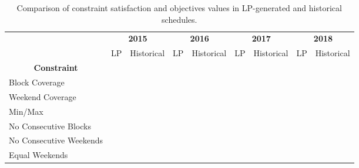 \begin{sidewaystable}[htbp] %
    \centering
    \caption{Comparison of constraint satisfaction and objectives values in LP-generated and historical schedules.}%
    \label{tbl:constraints-comparison}
		\begin{tabular}{l|cc|cc|cc|cc}
      \toprule
			\multirow{2}[1]{*}{}                                & \multicolumn{2}{c|}{\textbf{2015}} & \multicolumn{2}{c|}{\textbf{2016}} & \multicolumn{2}{c|}{\textbf{2017}} & \multicolumn{2}{c}{\textbf{2018}} \\
			                                                    &     LP     &      Historical       &     LP     &      Historical       &     LP     &      Historical       &     LP     &      Historical      \\ \midrule
			\multicolumn{1}{c|}{\textbf{Constraint}}            &            &                       &            &                       &            &                       &            &                      \\ \midrule
			Block Coverage                                      & \checkmark &      \checkmark       & \checkmark &      \checkmark       & \checkmark &      \checkmark       & \checkmark &      \checkmark      \\
			Weekend Coverage                                    & \checkmark &      \checkmark       & \checkmark &      \checkmark       & \checkmark &      \checkmark       & \checkmark &      \checkmark      \\
			Min/Max                                             & \checkmark &      \checkmark       & \checkmark &      \checkmark       & \checkmark &      \checkmark       & \checkmark &      \checkmark      \\
			No Consecutive Blocks                               & \checkmark &                       & \checkmark &                       & \checkmark &                       & \checkmark &                      \\
			No Consecutive Weekends                             & \checkmark &                       & \checkmark &                       & \checkmark &      \checkmark       & \checkmark &      \checkmark      \\
			Equal Weekends                                      & \checkmark &                       & \checkmark &                       & \checkmark &                       & \checkmark &                      \\

\end{tabular}
\end{sidewaystable}
